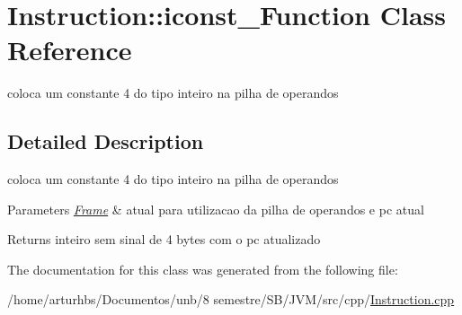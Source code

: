 \hypertarget{classInstruction_1_1iconst__4Function}{}\section{Instruction\+:\+:iconst\+\_\+Function Class Reference}
\label{classInstruction_1_1iconst__4Function}


coloca um constante 4 do tipo inteiro na pilha de operandos  




\subsection{Detailed Description}
coloca um constante 4 do tipo inteiro na pilha de operandos 


\begin{DoxyParams}{Parameters}
{\em \hyperlink{classFrame}{Frame}} & atual para utilizacao da pilha de operandos e pc atual \\
\hline
\end{DoxyParams}
\begin{DoxyReturn}{Returns}
inteiro sem sinal de 4 bytes com o pc atualizado 
\end{DoxyReturn}


The documentation for this class was generated from the following file\+:\begin{DoxyCompactItemize}
\item 
/home/arturhbs/\+Documentos/unb/8 semestre/\+S\+B/\+J\+V\+M/src/cpp/\hyperlink{Instruction_8cpp}{Instruction.\+cpp}\end{DoxyCompactItemize}
